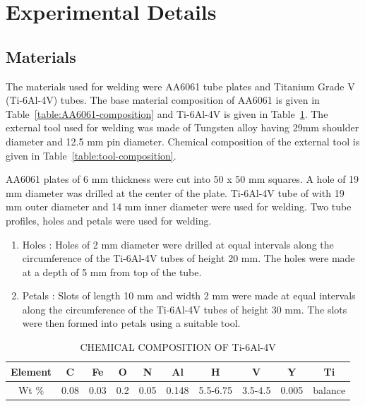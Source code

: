 \documentclass[3p]{elsarticle}
\begin{document}

\section{Experimental Details} 
\label{sec:Experimental Details}
\subsection{Materials}
\label{subsec:Materials}
The materials used for welding were AA6061 tube plates and Titanium Grade V (Ti-6Al-4V) tubes. The base material composition of AA6061 is given in Table~\ref{table:AA6061-composition} and Ti-6Al-4V is given in Table~\ref{table:Ti-6Al-4V-composition}. The external tool used for welding was made of Tungsten alloy having 29mm shoulder diameter and 12.5 mm pin diameter. Chemical composition of the external tool is given in Table~\ref{table:tool-composition}. 
\par 
AA6061 plates of 6 mm thickness were cut into 50 x 50 mm squares. A hole of 19 mm diameter was drilled at the center of the plate. Ti-6Al-4V tube of with 19 mm outer diameter and 14 mm inner diameter were used for welding. Two tube profiles, holes and petals were used for welding.
\begin{enumerate}[1.]
\item Holes : Holes of 2 mm diameter were drilled at equal intervals along the circumference of the Ti-6Al-4V tubes of height 20 mm. The holes were made at a depth of 5 mm from top of the tube.
\item Petals : Slots of length 10 mm and width 2 mm were made at equal intervals along the circumference of the Ti-6Al-4V tubes of height 30 mm. The slots were then formed into petals using a suitable tool.
\end{enumerate}

\begin{table}[!htbp]
\caption{CHEMICAL COMPOSITION OF Ti-6Al-4V}
\centering
\begin{tabular}{|c|c|c|c|c|c|c|c|c|c|}
\hline 
Element & C & Fe & O & N & Al & H & V & Y & Ti\\ 
\hline 
Wt \% & 0.08 & 0.03 & 0.2 & 0.05 & 0.148 & 5.5-6.75 & 3.5-4.5 & 0.005 & balance\\ 
\hline 
\end{tabular}
\label{table:Ti-6Al-4V-composition} %
\end{table}
\end{document}
